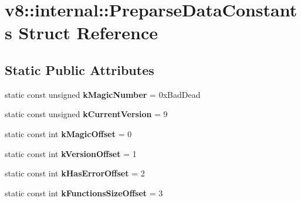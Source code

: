 \hypertarget{structv8_1_1internal_1_1_preparse_data_constants}{}\section{v8\+:\+:internal\+:\+:Preparse\+Data\+Constants Struct Reference}
\label{structv8_1_1internal_1_1_preparse_data_constants}
\subsection*{Static Public Attributes}
\begin{DoxyCompactItemize}
\item 
\hypertarget{structv8_1_1internal_1_1_preparse_data_constants_a2d9db03979d91e5cca2f0a253d675b92}{}static const unsigned {\bfseries k\+Magic\+Number} = 0x\+Bad\+Dead\label{structv8_1_1internal_1_1_preparse_data_constants_a2d9db03979d91e5cca2f0a253d675b92}

\item 
\hypertarget{structv8_1_1internal_1_1_preparse_data_constants_aac35b6842e6018caf0c8916693ef176f}{}static const unsigned {\bfseries k\+Current\+Version} = 9\label{structv8_1_1internal_1_1_preparse_data_constants_aac35b6842e6018caf0c8916693ef176f}

\item 
\hypertarget{structv8_1_1internal_1_1_preparse_data_constants_a455619b5fe3570f6d40ad72299d84fd6}{}static const int {\bfseries k\+Magic\+Offset} = 0\label{structv8_1_1internal_1_1_preparse_data_constants_a455619b5fe3570f6d40ad72299d84fd6}

\item 
\hypertarget{structv8_1_1internal_1_1_preparse_data_constants_ac2f97000121f05f2c596c0d39ebf333a}{}static const int {\bfseries k\+Version\+Offset} = 1\label{structv8_1_1internal_1_1_preparse_data_constants_ac2f97000121f05f2c596c0d39ebf333a}

\item 
\hypertarget{structv8_1_1internal_1_1_preparse_data_constants_a7f479972328fe6b3f7bfc5ff4394883b}{}static const int {\bfseries k\+Has\+Error\+Offset} = 2\label{structv8_1_1internal_1_1_preparse_data_constants_a7f479972328fe6b3f7bfc5ff4394883b}

\item 
\hypertarget{structv8_1_1internal_1_1_preparse_data_constants_aefaec23bad8ff778013dba953bb698f9}{}static const int {\bfseries k\+Functions\+Size\+Offset} = 3\label{structv8_1_1internal_1_1_preparse_data_constants_aefaec23bad8ff778013dba953bb698f9}


\end{DoxyCompactItemize}

